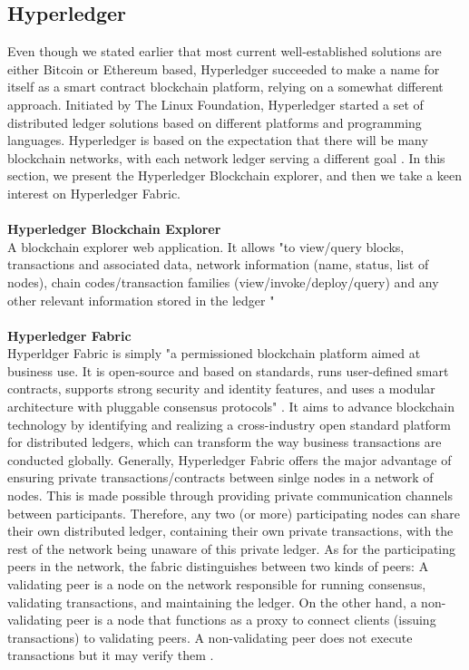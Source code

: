 \documentclass[a4paper]{article}
\begin{document}
\subsection{Hyperledger}
Even though we stated earlier that most current well-established solutions are either Bitcoin or Ethereum based, Hyperledger succeeded to make a name for itself as a smart contract blockchain platform, relying on a somewhat different approach. Initiated by The Linux Foundation, Hyperledger started a set of distributed ledger solutions based on different platforms and programming languages. Hyperledger is based on the expectation that there will be many blockchain networks, with each network ledger serving a different goal \cite{hype}. In this section, we present the Hyperledger Blockchain explorer, and then we take a keen interest on Hyperledger Fabric.
\\
\\
\textbf{\large{Hyperledger Blockchain Explorer}}\\
A blockchain explorer web application. It allows "to view/query blocks, transactions and associated data, network information (name, status, list of nodes), chain codes/transaction families (view/invoke/deploy/query) and any other relevant information stored in the ledger " \cite{hyperledger}
\\
\\
\textbf{\large{Hyperledger Fabric}}\\
Hyperldger Fabric is simply "a permissioned blockchain platform aimed at business use. It is open-source and based on standards, runs user-defined smart contracts, supports strong security and identity features, and uses a modular architecture with pluggable consensus protocols" \cite{hyper}. It aims to advance blockchain technology by identifying and realizing a cross-industry open standard platform for distributed ledgers, which can transform the way business transactions are conducted globally. Generally, Hyperledger Fabric offers the major advantage of ensuring private transactions/contracts between sinlge nodes in a network of nodes. This is made possible through providing 
private communication channels between participants. Therefore, any two (or more) participating nodes can share their own distributed ledger, containing their own private transactions, with the rest of the network being unaware of this private ledger. As for the participating peers in the network, the fabric distinguishes between two kinds of peers: A validating peer is a node on the network responsible for running consensus, validating transactions, and maintaining the ledger. On the other hand, a non-validating peer is a node that functions as a proxy to connect clients (issuing transactions) to validating peers. A non-validating peer does not execute transactions but it may verify them \cite{hyper}.
   
\end{document}
